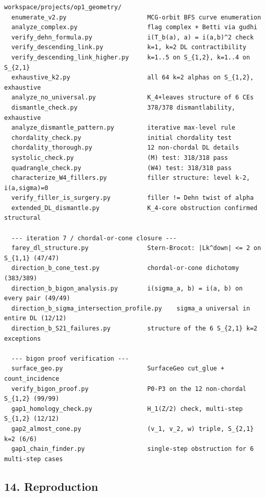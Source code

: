 \documentclass[
]{article}
\begin{document}
\begin{verbatim}
workspace/projects/op1_geometry/
  enumerate_v2.py                      MCG-orbit BFS curve enumeration
  analyze_complex.py                   flag complex + Betti via gudhi
  verify_dehn_formula.py               i(T_b(a), a) = i(a,b)^2 check
  verify_descending_link.py            k=1, k=2 DL contractibility
  verify_descending_link_higher.py     k=1..5 on S_{1,2}, k=1..4 on S_{2,1}
  exhaustive_k2.py                     all 64 k=2 alphas on S_{1,2}, exhaustive
  analyze_no_universal.py              K_4+leaves structure of 6 CEs
  dismantle_check.py                   378/378 dismantlability, exhaustive
  analyze_dismantle_pattern.py         iterative max-level rule
  chordality_check.py                  initial chordality test
  chordality_thorough.py               12 non-chordal DL details
  systolic_check.py                    (M) test: 318/318 pass
  quadrangle_check.py                  (W4) test: 318/318 pass
  characterize_W4_fillers.py           filler structure: level k-2, i(a,sigma)=0
  verify_filler_is_surgery.py          filler != Dehn twist of alpha
  extended_DL_dismantle.py             K_4-core obstruction confirmed structural

  --- iteration 7 / chordal-or-cone closure ---
  farey_dl_structure.py                Stern-Brocot: |Lk^down| <= 2 on S_{1,1} (47/47)
  direction_b_cone_test.py             chordal-or-cone dichotomy (383/389)
  direction_b_bigon_analysis.py        i(sigma_a, b) = i(a, b) on every pair (49/49)
  direction_b_sigma_intersection_profile.py    sigma_a universal in entire DL (12/12)
  direction_b_S21_failures.py          structure of the 6 S_{2,1} k=2 exceptions

  --- bigon proof verification ---
  surface_geo.py                       SurfaceGeo cut_glue + count_incidence
  verify_bigon_proof.py                P0-P3 on the 12 non-chordal S_{1,2} (99/99)
  gap1_homology_check.py               H_1(Z/2) check, multi-step S_{1,2} (12/12)
  gap2_almost_cone.py                  (v_1, v_2, w) triple, S_{2,1} k=2 (6/6)
  gap1_chain_finder.py                 single-step obstruction for 6 multi-step cases
\end{verbatim}

\subsection{14. Reproduction}\label{reproduction}
\end{document}
